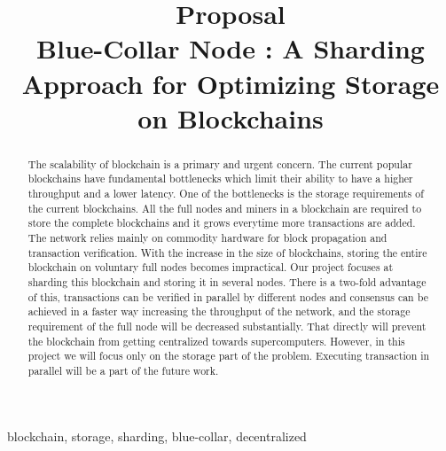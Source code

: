\documentclass[conference]{IEEEtran}
\begin{document}
\title{Proposal\\
Blue-Collar Node : A Sharding Approach for Optimizing Storage on Blockchains
}

\author{
\and
{}
}

\maketitle

\begin{abstract}
    The scalability of blockchain is a primary and urgent concern. The current
    popular blockchains have fundamental bottlenecks which limit their ability
    to have a higher throughput and a lower latency. One of the bottlenecks is
    the storage requirements of the current blockchains. All the full nodes and
    miners in a blockchain are required to store the complete blockchains and it
    grows everytime more transactions are added. The network relies mainly on
    commodity hardware for block propagation and transaction verification.
    With the increase in the size of blockchains, storing the entire blockchain
    on voluntary full nodes becomes impractical. Our project focuses at sharding
    this blockchain and storing it in several nodes. There is a two-fold advantage of this,
    transactions can be verified in parallel by different nodes and consensus
    can be achieved in a faster way increasing the throughput of the network,
    and the storage requirement of the full node will be decreased
    substantially. That directly will prevent the blockchain from getting
    centralized towards supercomputers. However, in this project we will focus
    only on the storage part of the problem. Executing transaction in parallel
    will be a part of the future work.
\end{abstract}

\begin{IEEEkeywords}
    blockchain, storage, sharding, blue-collar, decentralized
\end{IEEEkeywords}
\end{document}
